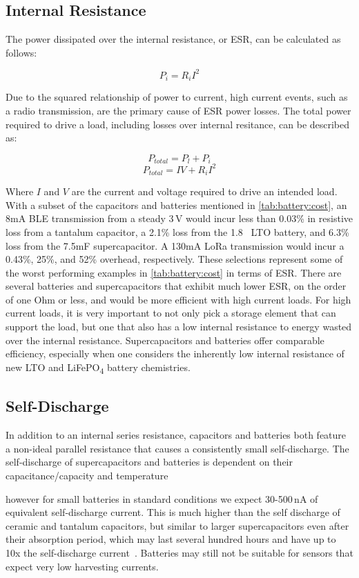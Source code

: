 \subsection{Internal Resistance}
The power dissipated over the internal resistance, or ESR, can be calculated as follows:

$$P_{i} = R_{i} I^2$$

Due to the squared relationship of power to current, high current events, such as a radio transmission, are the primary cause of ESR power losses. The total power required to drive a load, including losses over internal resitance, can be described as:

$$P_{total} = P_{l} + P_{i}$$
$$P_{total} =  I V + R_{i} I^2$$

Where $I$ and $V$ are the current and voltage required to drive an intended load.
With a subset of the
capacitors and batteries mentioned in \cref{tab:battery:cost}, an 8\si{\milli\ampere} BLE
transmission from a steady 3\,V would incur less
than 0.03\% in resistive loss from a tantalum capacitor, a 2.1\% loss from the 1.8\si{\milli\Ah} LTO battery, and 6.3\% loss from the 7.5\si{\milli\farad} supercapacitor. A 130\si{\milli\ampere} LoRa transmission would incur a 0.43\%, 25\%, and 52\% overhead, respectively. These selections represent some of the worst performing examples in \cref{tab:battery:cost} in terms of ESR. There are several batteries and supercapacitors that exhibit much lower ESR, on the order of one Ohm or less, and would be more efficient with high current loads.
For high current loads, it is very important to not only pick a storage element that can support the load, but one that also has a low internal resistance to energy wasted over the internal resistance. 
Supercapacitors and batteries offer comparable efficiency, especially when one considers the inherently low internal resistance of new LTO and LiFePO\textsubscript{4} battery chemistries.

\subsection{Self-Discharge}
In addition to an internal series resistance, capacitors and batteries both feature a non-ideal parallel resistance that causes a consistently small self-discharge.
The self-discharge of supercapacitors and batteries is dependent on their capacitance/capacity and temperature 

however for small batteries in standard conditions we expect 30-500\,nA
of equivalent self-discharge current. This is much higher than the self discharge
of ceramic and tantalum capacitors, but similar to larger supercapacitors
even after their absorption period, which may last several hundred hours and
have up to 10x the self-discharge current~\cite{murataTech}. Batteries may
still not be suitable for sensors that expect very low harvesting currents.\\

